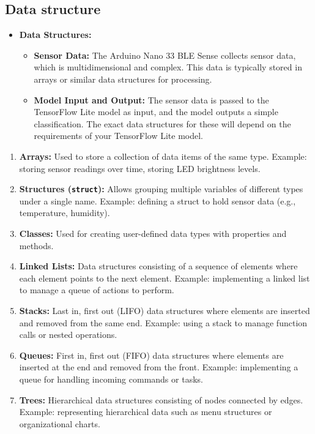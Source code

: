 \subsection{Data structure}

\begin{itemize}
	
		\item \textbf{Data Structures:}
	\begin{itemize}
		\item \textbf{Sensor Data:} The Arduino Nano 33 BLE Sense collects sensor data, which is multidimensional and complex. This data is typically stored in arrays or similar data structures for processing.
		\item \textbf{Model Input and Output:} The sensor data is passed to the TensorFlow Lite model as input, and the model outputs a simple classification. The exact data structures for these will depend on the requirements of your TensorFlow Lite model.\cite{Harris:2023}
		
	\end{itemize}
\end{itemize}




\begin{enumerate}
	\item \textbf{Arrays:} Used to store a collection of data items of the same type. Example: storing sensor readings over time, storing LED brightness levels.
	
	\item \textbf{Structures (\texttt{struct}):} Allows grouping multiple variables of different types under a single name. Example: defining a struct to hold sensor data (e.g., temperature, humidity).
	
	\item \textbf{Classes:} Used for creating user-defined data types with properties and methods. 
	
	\item \textbf{Linked Lists:} Data structures consisting of a sequence of elements where each element points to the next element. Example: implementing a linked list to manage a queue of actions to perform.
	
	\item \textbf{Stacks:} Last in, first out (LIFO) data structures where elements are inserted and removed from the same end. Example: using a stack to manage function calls or nested operations.
	
	\item \textbf{Queues:} First in, first out (FIFO) data structures where elements are inserted at the end and removed from the front. Example: implementing a queue for handling incoming commands or tasks.
	
	\item \textbf{Trees:} Hierarchical data structures consisting of nodes connected by edges. Example: representing hierarchical data such as menu structures or organizational charts.
\end{enumerate}



